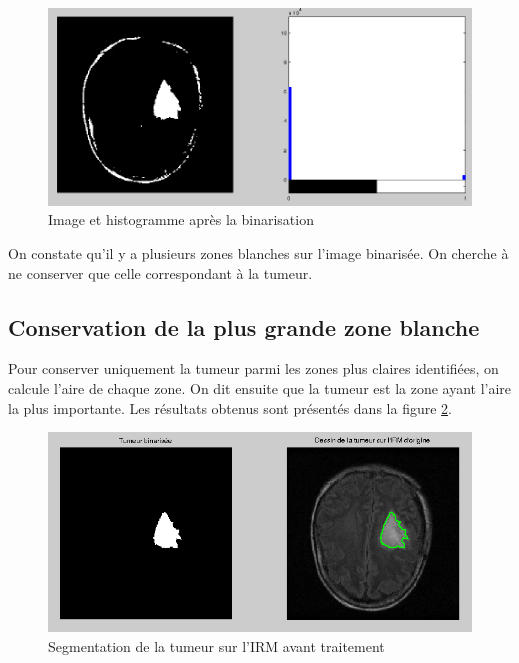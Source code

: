 		\begin{figure}[H]
			\centering
			\includegraphics[width=\textwidth]{images/1-histBinaire.png}
			\caption{Image et histogramme après la binarisation}
			\label{fig:histBinaire}
		\end{figure}

		On constate qu'il y a plusieurs zones blanches sur l'image binarisée. On cherche à ne conserver que celle correspondant à la tumeur.

	\subsection{Conservation de la plus grande zone blanche} %
	\label{ssub:conservation_de_la_plus_grande_zone_blanche}
		Pour conserver uniquement la tumeur parmi les zones plus claires identifiées, on calcule l'aire de chaque zone. On dit ensuite que la tumeur est la zone ayant l'aire la plus importante. Les résultats obtenus sont présentés dans la figure \ref{fig:tumeurBinaire}.

		\begin{figure}[H]
			\centering
			\includegraphics[width=\textwidth]{images/1-tumeur.png}
			\caption{Segmentation de la tumeur sur l'IRM avant traitement}
			\label{fig:tumeurBinaire}
		\end{figure}

